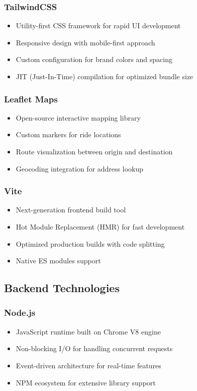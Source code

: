 \documentclass[12pt,a4paper]{article}
\begin{document}
\subsubsection{TailwindCSS}
\begin{itemize}
    \item Utility-first CSS framework for rapid UI development
    \item Responsive design with mobile-first approach
    \item Custom configuration for brand colors and spacing
    \item JIT (Just-In-Time) compilation for optimized bundle size
\end{itemize}

\subsubsection{Leaflet Maps}
\begin{itemize}
    \item Open-source interactive mapping library
    \item Custom markers for ride locations
    \item Route visualization between origin and destination
    \item Geocoding integration for address lookup
\end{itemize}

\subsubsection{Vite}
\begin{itemize}
    \item Next-generation frontend build tool
    \item Hot Module Replacement (HMR) for fast development
    \item Optimized production builds with code splitting
    \item Native ES modules support
\end{itemize}

\subsection{Backend Technologies}

\subsubsection{Node.js}
\begin{itemize}
    \item JavaScript runtime built on Chrome V8 engine
    \item Non-blocking I/O for handling concurrent requests
    \item Event-driven architecture for real-time features
    \item NPM ecosystem for extensive library support
\end{itemize}
\end{document}
